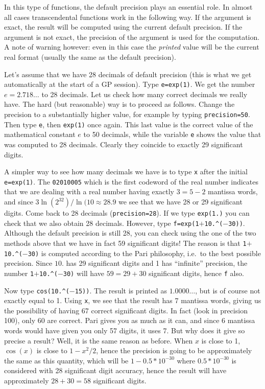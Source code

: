 In this type of functions, the default precision plays an essential role.
In almost all cases transcendental functions work in the following way.
If the argument is exact, the result will be computed using the current
default precision. If the argument is not exact, the precision of the
argument is used for the computation. A note of warning however: even in this
case the {\it printed\/} value will be the current real format (usually the
same as the default precision). 

Let's assume that we have 28 decimals of default precision (this is what
we get automatically at the start of a GP session). Type {\tt e=exp(1)}.
We get the number $e=2.718\dots$ to 28 decimals. Let us check how many
correct decimals we really have. The hard (but reasonable) way is to proceed
as follows. Change the precision to a substantially higher value, for example
by typing {\tt\bs precision=50}. Then type {\tt e}, then {\tt exp(1)} once
again. This last value is the correct value of the mathematical constant $e$
to 50 decimals, while the variable {\tt e} shows the value that was
computed to 28 decimals. Clearly they coincide to exactly 29 significant
digits.

A simpler way to see how many decimals we have is to type {\tt\bs x} after
the initial {\tt e=exp(1)}. The {\tt 02010005} which is the first codeword
of the real number indicates that we are dealing with a real number having
exactly $3=5-2$ mantissa words, and since $3\ln(2^32)/\ln(10\approx28.9$
we see that we have 28 or 29 significant digits.
\smallskip
Come back to 28 decimals ({\tt\bs precision=28}). If we type {\tt exp(1.)}
you can check that we also obtain 28 decimals. However, type 
{\tt f=exp(1$+$10.\^{}($-$30))}. Although the default precision is still 28,
you can check using the one of the two methods above that we have in fact 59
significant digits! The reason is that {\tt 1$+$10.\^{}($-$30)} is computed
according to the Pari philosophy, i.e.~to the best possible precision. Since
$10.$ has 29 significant digits and 1 has ``infinite'' precision, the number
{\tt 1$+$10.\^{}($-$30)} will have $59=29+30$ significant digits, hence {\tt f}
also.

Now type {\tt cos(10.\^{}($-$15))}. The result is printed as $1.0000\dots$,
but is of course not exactly equal to 1. Using {\tt\bs x}, we see that the
result has 7 mantissa words, giving us the possibility of having 67 
correct significant digits. In fact (look in precision 100), only 60 are 
correct. Pari gives you as much as it can, and since 6 mantissa words
would have given you only 57 digits, it uses 7. But why does it give so
precise a result? Well, it is the same reason as before. When $x$ is close
to 1, $\cos(x)$ is close to $1-x^2/2$, hence the precision is going to be
approximately the same as this quantity, which will be $1-0.5*10^{-30}$ where
$0.5*10^{-30}$ is considered with 28 significant digit accuracy, hence the
result will have approximately $28+30=58$ significant digits.


